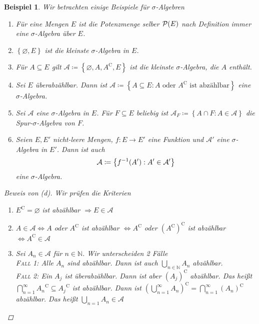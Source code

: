 \documentclass[11pt, twoside, a4paper]{article}
\theoremstyle{plain}
\newtheorem{beispiel}[blockelement]{Beispiel}
\numberwithin{equation}{subsection}
\newcommand{\set}[1]{\left\{#1\right\}}
\newcommand{\pair}[1]{\left(#1\right)}
\newcommand{\of}[1]{\mathopen{}\mathclose{}\bgroup\left(#1\aftergroup\egroup\right)}
\newcommand{\equivalent}[0]{\Leftrightarrow{}}
\newcommand{\impl}[0]{\Rightarrow{}}
\renewcommand{\emptyset}{\varnothing}
\newcommand{\comp}[1]{{#1}^{\mathrm{C}}}
\newcommand{\N}{\mathbb{N}}
\begin{document}
    \begin{beispiel}
        Wir betrachten einige Beispiele für $\sigma$-Algebren
        \begin{enumerate}[label=(\alph*)]
            \item Für eine Mengen $E$ ist die Potenzmenge selber $\mathcal{P}\of{E}$ nach Definition immer eine $\sigma$-Algebra über $E$.
            \item $\set{\emptyset, E}$ ist die kleinste $\sigma$-Algebra in $E$.
            \item Für $A \subseteq E$ gilt $\mathcal{A} \coloneqq \set{\emptyset, A, \comp{A}, E}$ ist die kleinste $\sigma$-Algebra, die $A$ enthält.
            \item Sei $E$ überabzählbar. Dann ist $\mathcal{A} \coloneqq \set{A\subseteq E: A \text{ oder }\comp{A}\text{ ist abzählbar}}$ eine $\sigma$-Algebra.
            \item Sei $\mathcal{A}$ eine $\sigma$-Algebra in $E$. Für $F\subseteq E$ beliebig ist $\mathcal{A}_F \coloneqq \set{A \cap F: A\in\mathcal{A}}$ die Spur-$\sigma$-Algebra von $F$.
            \item Seien $E, E'$ nicht-leere Mengen, $f: E\to E'$ eine Funktion und $\mathcal{A}'$ eine $\sigma$-Algebra in $E'$. Dann ist auch
            \begin{align*}
                \mathcal{A} \coloneqq \set{f^{-1}\of{A'}: A'\in\mathcal{A}'}
            \end{align*}
            eine $\sigma$-Algebra.
        \end{enumerate}

        \begin{proof}[Beweis von (d)]
            Wir prüfen die Kriterien
            \begin{enumerate}[label=($\Sigma_{\arabic*}$)]
                \item $\comp{E} = \emptyset$ ist abzählbar $\impl E\in\mathcal{A}$
                \item $A\in\mathcal{A} \equivalent A$ oder $\comp{A}$ ist abzählbar $\equivalent \comp{A}$ oder $\comp{\pair{\comp{A}}}$ ist abzählbar $\equivalent \comp{A} \in\mathcal{A}$
                \item Sei $A_n \in\mathcal{A}$ für $n\in\N$. Wir unterscheiden 2 Fälle\\
                \textsc{Fall 1}: Alle $A_n$ sind abzählbar. Dann ist auch $\bigcup_{n\in\N} A_n$ abzählbar.\\
                \textsc{Fall 2}: Ein $A_j$ ist überabzählbar. Dann ist aber $\comp{\pair{A_j}}$ abzählbar. Das heißt $\bigcap_{n=1}^{\infty} \comp{A_n} \subseteq \comp{A_j}$ ist abzählbar. Dann ist $\comp{\pair{\bigcup_{n=1}^{\infty} A_n}} = \bigcap_{n=1}^{\infty} \comp{\pair{A_n}}$ abzählbar. Das heißt $\bigcup_{n=1} A_n \in\mathcal{A}$
            \end{enumerate}
        \end{proof}
    \end{beispiel}
\end{document}
